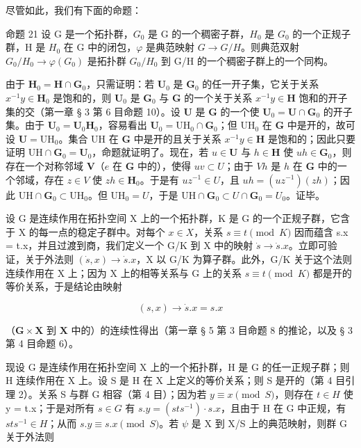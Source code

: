尽管如此，我们有下面的命题：

命题 21 设 G 是一个拓扑群，\(G_{0}\) 是 G 的一个稠密子群，\(H_{0}\) 是 \(G_{0}\) 的一个正规子群，H 是 \(H_{0}\) 在 G 中的闭包，\(\varphi\) 是典范映射 \(G \rightarrow G/H\)。则典范双射 \(G_{0}/H_{0} \rightarrow \varphi(G_{0})\) 是拓扑群 \(G_{0}/H_{0}\) 到 G/H 的一个稠密子群上的一个同构。

由于 \(\mathbf{H}_0 = \mathbf{H} \cap \mathbf{G}_0\)，只需证明：若 \(\mathbf{U}_0\) 是 \(\mathbf{G}_0\) 的任一开子集，它关于关系 \(x^{-1}y \in \mathbf{H}_0\) 是饱和的，则 \(\mathbf{U}_0\) 是 \(\mathbf{G}_0\) 与 \(\mathbf{G}\) 的一个关于关系 \(x^{-1}y \in \mathbf{H}\) 饱和的开子集的交（第一章 § 3 第 6 目命题 10）。设 \(\mathbf{U}\) 是 \(\mathbf{G}\) 的一个使 \(\mathbf{U}_0 = \mathbf{U} \cap \mathbf{G}_0\) 的开子集。由于 \(\mathbf{U}_0 = \mathbf{U}_0\mathbf{H}_0\)，容易看出 \(\mathbf{U}_0 = \mathrm{UH}_0 \cap \mathbf{G}_0\)；但 \(\mathrm{UH}_0\) 在 \(\mathbf{G}\) 中是开的，故可设 \(\mathbf{U} = \mathrm{UH}_0\)。集合 \(\mathrm{UH}\) 在 \(\mathbf{G}\) 中是开的且关于关系 \(x^{-1}y \in \mathbf{H}\) 是饱和的；因此只要证明 \(\mathrm{UH} \cap \mathbf{G}_0 = \mathbf{U}_0\)，命题就证明了。现在，若 \(u \in \mathbf{U}\) 与 \(h \in \mathbf{H}\) 使 \(uh \in \mathbf{G}_0\)，则存在一个对称邻域 \(\mathbf{V}\)（\(e\) 在 \(\mathbf{G}\) 中的），使得 \(uv \subset U\)；由于 \(Vh\) 是 \(h\) 在 \(\mathbf{G}\) 中的一个邻域，存在 \(z \in V\) 使 \(zh \in \mathbf{H}_0\)。于是有 \(uz^{-1} \in U\)，且 \(uh = (uz^{-1})(zh)\)；因此 \(\mathrm{UH} \cap \mathbf{G}_0 \subset \mathrm{UH}_0\)。但 \(\mathrm{UH}_0 = U\)，于是 \(\mathrm{UH} \cap \mathbf{G}_0 \subset U \cap \mathbf{G}_0 = U_0\)。证毕。

设 G 是连续作用在拓扑空间 X 上的一个拓扑群，K 是 G 的一个正规子群，它含于 X 的每一点的稳定子群中。对每个 \(x \in X\)，关系 \(s \equiv t \pmod{K}\) 因而蕴含 s.x = t.x，并且过渡到商，我们定义一个 G/K 到 X 中的映射 \(\dot{s} \to \dot{s}.x\)。立即可验证，关于外法则 \((\dot{s}, x) \to \dot{s}.x\)，X 以 G/K 为算子群。此外，G/K 关于这个法则连续作用在 X 上；因为 X 上的相等关系与 G 上的关系 \(s \equiv t \pmod{K}\) 都是开的等价关系，于是结论由映射

\[
(s, x) \rightarrow \dot {s}. x = s. x
\]

（\(\mathbf{G} \times \mathbf{X}\) 到 \(\mathbf{X}\) 中的）的连续性得出（第一章 § 5 第 3 目命题 8 的推论，以及 § 3 第 4 目命题 6）。

现设 G 是连续作用在拓扑空间 X 上的一个拓扑群，H 是 G 的任一正规子群；则 H 连续作用在 X 上。设 S 是 H 在 X 上定义的等价关系；则 S 是开的（第 4 目引理 2）。关系 S 与群 G 相容（第 4 目）；因为若 \(y \equiv x \pmod{S}\)，则存在 \(t \in H\) 使 y = t.x；于是对所有 \(s \in G\) 有 \(s.y = (sts^{-1}) \cdot s.x\)，且由于 H 在 G 中正规，有 \(sts^{-1} \in H\)；从而 \(s.y \equiv s.x \pmod{S}\)。若 \(\psi\) 是 X 到 X/S 上的典范映射，则群 G 关于外法则


